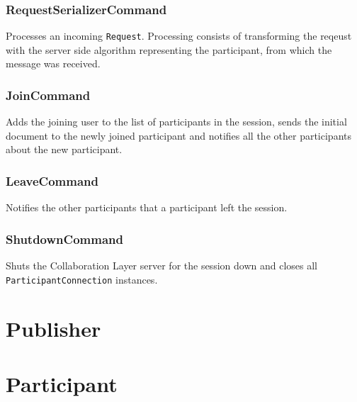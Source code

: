 \subsubsection{RequestSerializerCommand} Processes an incoming
\texttt{Request}. Processing consists of transforming the reqeust with
the server side algorithm representing the participant, from which the
message was received.

\subsubsection{JoinCommand} Adds the joining user to the list of participants
in the session, sends the initial document to the newly joined participant
and notifies all the other participants about the new participant.

\subsubsection{LeaveCommand} Notifies the other participants that a participant
left the session.

\subsubsection{ShutdownCommand} Shuts the Collaboration Layer server for the
session down and closes all \texttt{ParticipantConnection} instances.



\section{Publisher}


\section{Participant}



